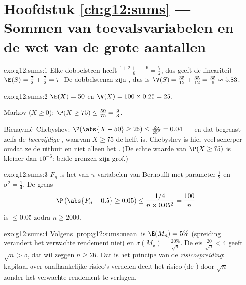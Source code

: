 \section*{Hoofdstuk \ref{ch:g12:sums} --- Sommen van toevalsvariabelen en de wet van de grote aantallen}

\begin{solution}{exo:g12:sums:1}
Elke dobbelsteen heeft 
$\frac{1 + 2 + \dots + 6}{6} = \frac{7}{2}$, dus geeft de lineariteit
$\E(S) = \frac72 + \frac72 = 7$. De dobbelstenen zijn , dus is
$\V(S) = \frac{35}{12} + \frac{35}{12} = \frac{35}{6} \approx 5.83$.
\end{solution}

\begin{solution}{exo:g12:sums:2}
$\E(X) = 50$ en $\V(X) = 100 \times 0.25 = 25$.

Markov ($X \geq 0$): $\P(X \geq 75) \leq \frac{50}{75} = \frac23$.

Bienaymé--Chebyshev: $\P(\abs{X - 50} \geq 25) \leq \frac{25}{25^2} = 0.04$
--- en dat begrenst zelfs de \emph{tweezijdige} , waarvan
$X \geq 75$ de helft is. Chebyshev is hier veel scherper omdat ze de
 uitbuit en niet alleen het . (De echte waarde van
$\P(X \geq 75)$ is kleiner dan $10^{-6}$: beide grenzen zijn grof.)
\end{solution}

\begin{solution}{exo:g12:sums:3}
$F_n$ is het  van $n$ variabelen van Bernoulli met
parameter $\frac12$ en  $\sigma^2 = \frac14$. De grens
\[
\P\left(\abs{F_n - 0.5} \geq 0.05\right)
\leq \frac{1/4}{n \times 0.05^2} = \frac{100}{n}
\]
is $\leq 0.05$ zodra $n \geq 2000$.
\end{solution}

\begin{solution}{exo:g12:sums:4}
Volgens \cref{prop:g12:sums:mean} is $\E(M_n) = 5\%$ (spreiding verandert het
verwachte rendement niet) en $\sigma(M_n) = \frac{20\%}{\sqrt n}$. De eis
$\frac{20}{\sqrt n} < 4$ geeft $\sqrt n > 5$, dat wil zeggen $n \geq 26$. Dat
is het principe van de \emph{risicospreiding}: kapitaal over onafhankelijke
risico's verdelen deelt het risico (de ) door $\sqrt n$
zonder het verwachte rendement te verlagen.
\end{solution}

